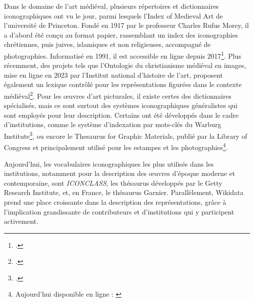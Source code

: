 Dans le domaine de l’art médiéval, plusieurs répertoires et dictionnaires iconographiques ont vu le jour, parmi lesquels l’Index of Medieval Art de l’université de Princeton. Fondé en 1917 par le professeur Charles Rufus Morey, il a d’abord été conçu au format papier, rassemblant un index des iconographies chrétiennes, puis juives, islamiques et non religieuses, accompagné de photographies. Informatisé en 1991, il est accessible en ligne depuis 2017\footcite{HistoryIndex}. Plus récemment, des projets tels que l’Ontologie du christianisme médiéval en images, mise en ligne en 2023 par l’Institut national d’histoire de l’art, proposent également un lexique contrôlé pour les représentations figurées dans le contexte médiéval\footcite{beaudOntologieChristianismeMedieval2023}.
Pour les œuvres d’art picturales, il existe certes des dictionnaires spécialisés, mais ce sont surtout des systèmes iconographiques généralistes qui sont employés pour leur description. Certains ont été développés dans le cadre d’institutions, comme le système d’indexation par mots-clés du Warburg Institute\footcite{thewarburginstituteSummaryGuidePhotographic1988}, ou encore le Thesaurus for Graphic Materials, publié par la Library of Congress et principalement utilisé pour les estampes et les photographies\footnote{Aujourd’hui disponible en ligne : \cite{libraryofcongressThesaurusGraphicMaterials2024}}.

Aujourd’hui, les vocabulaires iconographiques les plus utilisés dans les institutions, notamment pour la description des œuvres d’époque moderne et contemporaine, sont \textit{ICONCLASS}, les thésaurus développés par le Getty Research Institute, et, en France, le thésaurus Garnier. Parallèlement, Wikidata prend une place croissante dans la description des représentations, grâce à l’implication grandissante de contributeurs et d’institutions qui y participent activement.

